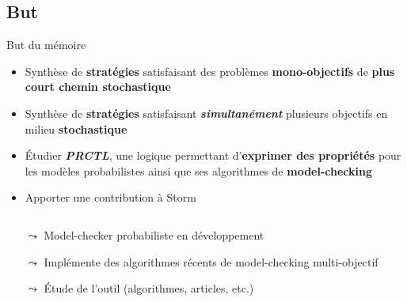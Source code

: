 \documentclass[compress]{beamer}
\theoremstyle{theorem}%
\newcommand\sfont[1]{\textnormal{\fontfamily{qpl}\selectfont #1}}
\begin{document}
\subsection{But}

\begin{frame}{But du mémoire} \footnotesize
  \begin{itemize}
    \item Synthèse de \textbf{\color{fibeamer@orange}stratégies} satisfaisant des problèmes \textbf{\color{fibeamer@orange}mono-objectifs} de \textbf{\color{fibeamer@orange}plus court chemin stochastique}
    \item Synthèse de \textbf{\color{orange}stratégies} satisfaisant \textbf{\itshape \color{fibeamer@orange}simultanément} plusieurs objectifs en
    milieu \textbf{\color{fibeamer@orange}stochastique}
    \item \'Etudier \textbf{\itshape\color{fibeamer@blue}PRCTL}, une logique permettant d'\textbf{\color{fibeamer@orange}exprimer des propriétés} %
    pour les modèles probabilistes
    ainsi que ses algorithmes de \textbf{\color{fibeamer@orange}model-checking}
    \item Apporter une contribution à \sfont{\color{fibeamer@orange}Storm}
  \end{itemize}
    \begin{columns}
      \begin{column}{0.55\linewidth}
        \vspace{-.05\linewidth}
        \begin{itemize}\footnotesize
            \item[$\leadsto$] Model-checker probabiliste en développement
            \item[$\leadsto$] Implémente des algorithmes récents de model-checking multi-objectif
            \item[$\leadsto$] \'Etude de l'outil (algorithmes, articles, etc.)
        \end{itemize}
      \end{column}
      \begin{column}{0.2\linewidth}

\end{column}
\end{columns}
\end{frame}
\end{document}
